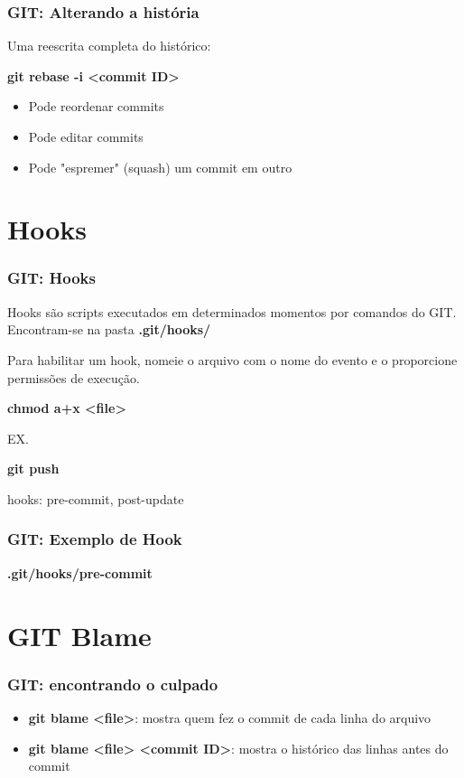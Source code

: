\documentclass{beamer}
\begin{document}
\begin{frame}
\frametitle{GIT: Alterando a história}

Uma reescrita completa do histórico:

\textbf{git rebase -i <commit ID>}

\begin{itemize}
\item Pode reordenar commits
\item Pode editar commits
\item Pode "espremer" (squash) um commit em outro
\end{itemize}


\end{frame}

\section{Hooks}
\begin{frame}
\frametitle{GIT: Hooks}

Hooks são scripts executados em determinados momentos por comandos do GIT. Encontram-se na pasta \textbf{.git/hooks/}

Para habilitar um hook, nomeie o arquivo com o nome do evento e o proporcione permissões de execução.

\textbf{chmod a+x <file>}

EX.

\textbf{git push}

hooks: pre-commit, post-update
\end{frame}

\begin{frame}
\frametitle{GIT: Exemplo de Hook}

\textbf{.git/hooks/pre-commit}

\end{frame}

\section{GIT Blame}
\begin{frame}
\frametitle{GIT: encontrando o culpado}


\begin{itemize}
\item \textbf{git blame <file>}: mostra quem fez o commit de cada linha do arquivo
\item \textbf{git blame <file> <commit ID>}: mostra o histórico das linhas antes do commit
\end{itemize}
\end{frame}
\end{document}

